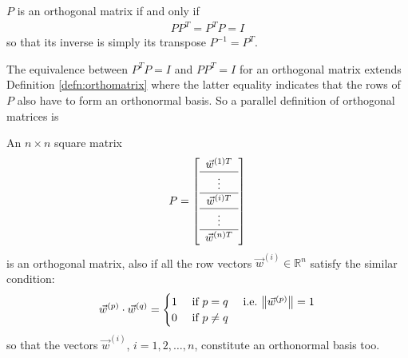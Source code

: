 \begin{proper}
\label{proper:orthoinvT}
$P$ is an orthogonal matrix if and only if 
\begin{align}
PP^T = P^TP = I \label{eqn:orthomatPPT}
\end{align} so that its inverse is simply its transpose $P^{-1} = P^T$.
\end{proper}
The equivalence between $P^TP=I$ and $PP^T = I$ for an orthogonal matrix extends Definition \ref{defn:orthomatrix} where the latter equality indicates that the rows of $P$ also have to form an orthonormal basis. So a parallel definition of orthogonal matrices is
\begin{defn}
An $n \times n$ square matrix
\begin{align*}
P = \left[
\begin{array}{c}
\vec{w}^{(1)T}\\
\hline
\vdots \\
\hline
\vec{w}^{(i)T} \Tstrut \\
\hline
\vdots \\
\hline
\vec{w}^{(n)T} \Tstrut 
\end{array}
\right]
\end{align*}
is an orthogonal matrix, also if all the row vectors $\vec{w}^{(i)} \in \mathbb{R}^n$ satisfy the similar condition:
\begin{align}
\vec{w}^{(p)} \cdot \vec{w}^{(q)} =
\begin{cases}
1 &\text{ if } p = q \quad \text{ i.e.\ } \norm{\vec{w}^{(p)}} = 1 \\
0 &\text{ if } p \neq q    
\end{cases}
\end{align}
so that the vectors $\vec{w}^{(i)}$, $i=1,2,\ldots,n$, constitute an orthonormal basis too.
\end{defn}

